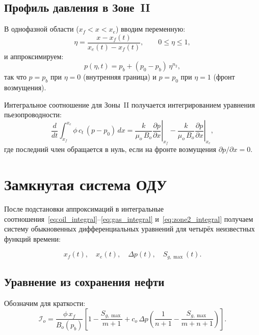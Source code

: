 \documentclass[12pt,a4paper]{article}
\begin{document}
\subsection{Профиль давления в Зоне~II}

В однофазной области ($x_f < x < x_e$) вводим переменную:
\begin{equation}\label{eq:eta}
  \eta = \frac{x - x_f(t)}{x_e(t) - x_f(t)}, \qquad 0 \le \eta \le 1,
\end{equation}
и аппроксимируем:
\begin{equation}\label{eq:pressure_zone2}
  p(\eta,t) = p_b + (p_0 - p_b)\,\eta^{n_2},
\end{equation}
так что $p = p_b$ при $\eta = 0$ (внутренняя граница)
и $p = p_0$ при $\eta = 1$ (фронт возмущения).

Интегральное соотношение для Зоны~II получается интегрированием
уравнения пьезопроводности:
\begin{equation}\label{eq:zone2_integral}
  \frac{d}{dt}\int_{x_f}^{x_e}\phi\,c_t\,(p - p_0)\,dx
  = \left.\frac{k}{\mu_o\,B_o}\frac{\partial p}{\partial x}
  \right|_{x_f}
  - \left.\frac{k}{\mu_o\,B_o}\frac{\partial p}{\partial x}
  \right|_{x_e},
\end{equation}
где последний член обращается в нуль, если на фронте возмущения
$\partial p/\partial x = 0$.

\section{Замкнутая система ОДУ}

После подстановки аппроксимаций в интегральные
соотношения~\eqref{eq:oil_integral}--\eqref{eq:gas_integral}
и~\eqref{eq:zone2_integral} получаем систему обыкновенных
дифференциальных уравнений для четырёх неизвестных функций времени:

\begin{equation}\label{eq:unknowns}
  x_f(t), \quad x_e(t), \quad \Delta p(t), \quad S_{g,\max}(t).
\end{equation}

\subsection{Уравнение из сохранения нефти}

Обозначим для краткости:
\[
  \mathcal{I}_o = \frac{\phi\,x_f}{B_o(p_b)}
  \left[1 - \frac{S_{g,\max}}{m+1}
  + c_o\,\Delta p\left(\frac{1}{n+1}
  - \frac{S_{g,\max}}{m+n+1}\right)\right].
\]
\end{document}
